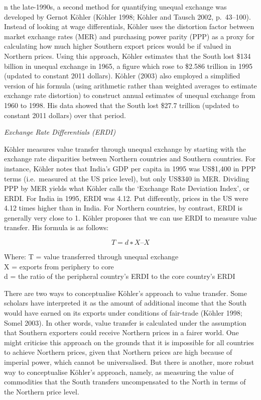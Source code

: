 \documentclass[
]{book}
\begin{document}
n the late-1990s, a second method for quantifying unequal exchange was developed by Gernot
Köhler (Köhler 1998; Köhler and Tausch 2002, p.~43--100). Instead of looking at wage differentials,
Köhler uses the distortion factor between market exchange rates (MER) and purchasing power
parity (PPP) as a proxy for calculating how much higher Southern export prices would be if
valued in Northern prices. Using this approach, Köhler estimates that the South lost \$134 billion
in unequal exchange in 1965, a figure which rose to \$2.586 trillion in 1995 (updated to constant
2011 dollars). Köhler (2003) also employed a simplified version of his formula (using arithmetic
rather than weighted averages to estimate exchange rate distortion) to construct annual estimates
of unequal exchange from 1960 to 1998. His data showed that the South lost \$27.7 trillion (updated
to constant 2011 dollars) over that period.

\emph{Exchange Rate Differentials (ERDI)}

Köhler measures value transfer through unequal exchange by starting with the exchange rate
disparities between Northern countries and Southern countries. For instance, Köhler notes that
India's GDP per capita in 1995 was US\$1,400 in PPP terms (i.e.~measured at the US price level),
but only US\$340 in MER. Dividing PPP by MER yields what Köhler calls the `Exchange Rate Deviation
Index', or ERDI. For India in 1995, ERDI was 4.12. Put differently, prices in the US were 4.12 times
higher than in India. For Northern countries, by contrast, ERDI is generally very close to 1. Köhler proposes that we can use ERDI to measure value transfer. His formula is as follows:

\[T = d∗X –X\]

Where:
T = value transferred through unequal exchange\\
X = exports from periphery to core\\
d = the ratio of the peripheral country's ERDI to the core country's ERDI

There are two ways to conceptualise Köhler's approach to value transfer. Some scholars have
interpreted it as the amount of additional income that the South would have earned on its
exports under conditions of fair-trade (Köhler 1998; Somel 2003). In other words, value transfer is
calculated under the assumption that Southern exporters could receive Northern prices in a fairer
world. One might criticise this approach on the grounds that it is impossible for all countries to
achieve Northern prices, given that Northern prices are high because of imperial power, which
cannot be universalised. But there is another, more robust way to conceptualise Köhler's approach,
namely, as measuring the value of commodities that the South transfers uncompensated to the
North in terms of the Northern price level.
\end{document}
